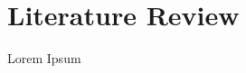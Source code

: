 \documentclass[main.tex]{subfiles}
\begin{document}
\section{Literature Review}
Lorem Ipsum
\end{document}
